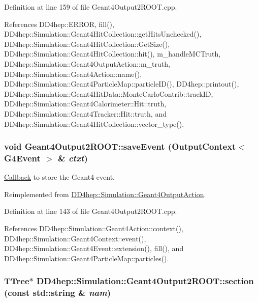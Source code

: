 Definition at line 159 of file Geant4Output2ROOT.cpp.

References DD4hep::ERROR, fill(), DD4hep::Simulation::Geant4HitCollection::getHitsUnchecked(), DD4hep::Simulation::Geant4HitCollection::GetSize(), DD4hep::Simulation::Geant4HitCollection::hit(), m\_\-handleMCTruth, DD4hep::Simulation::Geant4OutputAction::m\_\-truth, DD4hep::Simulation::Geant4Action::name(), DD4hep::Simulation::Geant4ParticleMap::particleID(), DD4hep::printout(), DD4hep::Simulation::Geant4HitData::MonteCarloContrib::trackID, DD4hep::Simulation::Geant4Calorimeter::Hit::truth, DD4hep::Simulation::Geant4Tracker::Hit::truth, and DD4hep::Simulation::Geant4HitCollection::vector\_\-type().\hypertarget{class_d_d4hep_1_1_simulation_1_1_geant4_output2_r_o_o_t_a0562da9b5fdb0f81fa8d14457fd3f319}{
\subsubsection[{saveEvent}]{\setlength{\rightskip}{0pt plus 5cm}void Geant4Output2ROOT::saveEvent ({\bf OutputContext}$<$ G4Event $>$ \& {\em ctxt})}}
\label{class_d_d4hep_1_1_simulation_1_1_geant4_output2_r_o_o_t_a0562da9b5fdb0f81fa8d14457fd3f319}


\hyperlink{class_d_d4hep_1_1_callback}{Callback} to store the Geant4 event. 

Reimplemented from \hyperlink{class_d_d4hep_1_1_simulation_1_1_geant4_output_action_a660080e931d757573839927ca99bfbed}{DD4hep::Simulation::Geant4OutputAction}.

Definition at line 143 of file Geant4Output2ROOT.cpp.

References DD4hep::Simulation::Geant4Action::context(), DD4hep::Simulation::Geant4Context::event(), DD4hep::Simulation::Geant4Event::extension(), fill(), and DD4hep::Simulation::Geant4ParticleMap::particles().\hypertarget{class_d_d4hep_1_1_simulation_1_1_geant4_output2_r_o_o_t_a977fb2f2bed7eb8e80ec52e91bc4ac4d}{
\subsubsection[{section}]{\setlength{\rightskip}{0pt plus 5cm}TTree$\ast$ DD4hep::Simulation::Geant4Output2ROOT::section (const std::string \& {\em nam})}}
\label{class_d_d4hep_1_1_simulation_1_1_geant4_output2_r_o_o_t_a977fb2f2bed7eb8e80ec52e91bc4ac4d}


